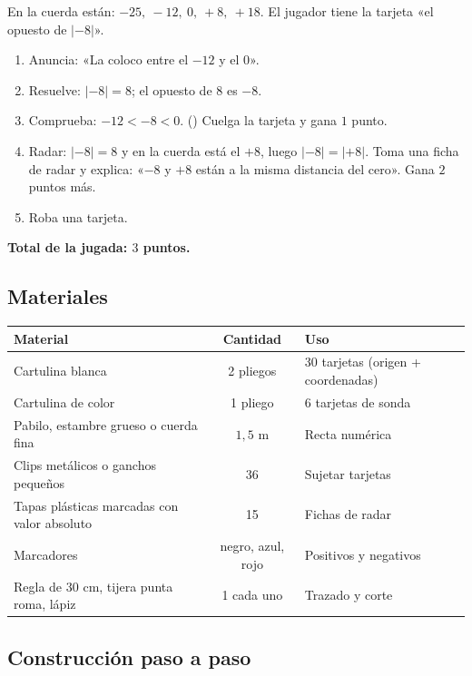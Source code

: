 \documentclass[12pt, letterpaper]{article}
\newcommand{\abs}[1]{\lvert #1\rvert}
\begin{document}
En la cuerda están: $-25,\ -12,\ 0,\ +8,\ +18$. El jugador tiene la tarjeta «el opuesto de $\abs{-8}$».

\begin{cuadrosolucion}
\begin{enumerate}[leftmargin=*]
  \item Anuncia: «La coloco entre el $-12$ y el $0$».
  \item Resuelve: $\abs{-8}=8$; el opuesto de $8$ es $-8$.
  \item Comprueba: $-12<-8<0$. (\checkmark) Cuelga la tarjeta y gana $1$ punto.
  \item Radar: $\abs{-8}=8$ y en la cuerda está el $+8$, luego $\abs{-8}=\abs{+8}$. Toma una ficha de radar y explica: «$-8$ y $+8$ están a la misma distancia del cero». Gana $2$ puntos más.
  \item Roba una tarjeta.
\end{enumerate}
\textbf{Total de la jugada: $3$ puntos.}
\end{cuadrosolucion}

\subsection{Materiales}

\begin{center}
\small
\begin{tabular}{@{}p{5.0cm} c p{7.4cm}@{}}
\toprule
\textbf{Material} & \textbf{Cantidad} & \textbf{Uso}\\
\midrule
Cartulina blanca & 2 pliegos & 30 tarjetas (origen + coordenadas)\\
Cartulina de color & 1 pliego & 6 tarjetas de sonda\\
Pabilo, estambre grueso o cuerda fina & $1{,}5$ m & Recta numérica\\
Clips metálicos o ganchos pequeños & 36 & Sujetar tarjetas\\
Tapas plásticas marcadas con valor absoluto & 15 & Fichas de radar\\
Marcadores & negro, azul, rojo & Positivos y negativos\\
Regla de $30$ cm, tijera punta roma, lápiz & 1 cada uno & Trazado y corte\\
\bottomrule
\end{tabular}
\end{center}

\subsection{Construcción paso a paso}
\end{document}

